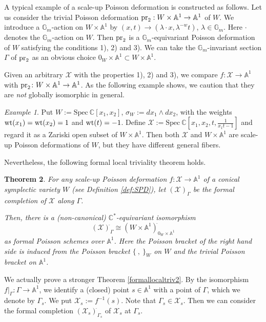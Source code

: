 \documentclass[12pt,a4paper]{amsart}
\newtheorem{Thm}{Theorem}[section]
\theoremstyle{remark}
\newtheorem{ex}[Thm]{Example}
\theoremstyle{definition}
\def\C{\mathbb{C}}
\def\G{\mathbb{G}}
\def\A{\mathbb{A}}
\begin{document}
A typical example of a scale-up Poisson deformation is constructed as follows. 
Let us consider the trivial Poisson deformation ${\rm pr}_2: W \times \A^1 \to \A^1$ of $W$. We introduce a 
$\G_m$-action on $W \times \A^1$ by $(x, t) \to (\lambda\cdot x, \lambda^{-w}t)$, $\lambda \in \G_m$. 
Here $\cdot$ denotes the $\G_m$-action on $W$.        
Then ${\rm pr}_2$ is a $\G_m$-equivariant Poisson deformation of $W$ satisfying the conditions 1), 2) and 3). We can take 
the $\G_m$-invariant section $\Gamma$ of ${\rm pr}_2$ as an obvious choice 
$0_W \times \A^1 \subset W \times \A^1$.

Given an arbitrary $\mathcal{X}$ with the properties 1), 2) and 3), we compare $f\colon \mathcal{X} \to \A^1$ 
with ${\rm pr}_2\colon W \times \A^1 \to \A^1$. 
As the following example shows, we caution that 
they are {\it not} globally isomorphic in general. 

\begin{ex} 
Put $W := \mathrm{Spec}\: \C[x_1, x_2]$, 
$\sigma_W := dx_1 \wedge dx_2$, 
with the weights 
${\rm wt}(x_1) = {\rm wt}(x_2) = 1$ 
and ${\rm wt}(t) = -1$. Define $\mathcal{X} := \mathrm{Spec}\: \C[x_1, x_2, t, \frac{1}{x_1t - 1}]$ and regard it as a Zariski open subset 
of $W \times \A^1$. Then both $\mathcal{X}$ and $W \times \A^1$ are scale-up Poisson deformations of $W$, but 
they have different general fibers. 
\end{ex}

Nevertheless, the following formal local triviality theorem holds. 
\vspace{0.2cm}

\begin{Thm}\label{formallocaltriv}
For any scale-up Poisson deformation 
$f\colon \mathcal{X}\to \A^1$ 
of a conical symplectic variety $W$ (see Definition 
\ref{def:SPD}), 
 let $({\mathcal X})^{\hat{}}_{\Gamma}$ be the formal completion of $\mathcal{X}$ along $\Gamma$. 
 
Then, there is a (non-canonical) $\C^*$-equivariant 
isomorphism 
$$({\mathcal X})^{\hat{}}_{\Gamma} \cong (W \times 
\A^1)^{\hat{}}_{0_W \times \A^1}$$ as formal Poisson 
schemes over $\A^1$. Here the Poisson bracket of the right hand side is induced from the Poisson bracket $\{\:, \:\}_W$ on $W$ and the trivial Poisson bracket on $\A^1$.
\end{Thm}
\vspace{0.2cm}

We actually prove a stronger Theorem \ref{formallocaltriv2}. 
By the isomorphism $f\vert_{\Gamma}\colon \Gamma \to \A^1$, we identify a (closed) point $s \in \A^1$ with a 
point of  $\Gamma$, which we denote by $\Gamma_s$. We put  $\mathcal{X}_s := f^{-1}(s)$.   
Note that $\Gamma_s \in \mathcal{X}_s$. Then we can consider the 
formal completion $(\mathcal{X}_s)^{\hat{}}_{\Gamma_s}$ of $\mathcal{X}_s$ at $\Gamma_s$. \vspace{0.2cm}
\end{document}
